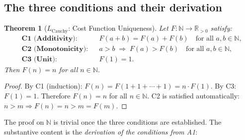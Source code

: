\documentclass[11pt]{article}
\newtheorem{theorem}{Theorem}[section]
\theoremstyle{definition}
\begin{document}
\subsection{The three conditions and their derivation}
\label{sec:cauchy_conditions}

\begin{theorem}[$L_{\mathrm{Cauchy}}$: Cost Function Uniqueness]\label{thm:LCauchy}
Let $F: \mathbb{N} \to \mathbb{R}_{>0}$ satisfy:
\begin{align}
  &\textbf{C1 (Additivity):}  &&F(a + b) = F(a) + F(b)
    \quad \text{for all } a, b \in \mathbb{N}, \label{eq:C1_supp} \\
  &\textbf{C2 (Monotonicity):} &&a > b \;\Rightarrow\; F(a) > F(b)
    \quad \text{for all } a, b \in \mathbb{N}, \label{eq:C2_supp} \\
  &\textbf{C3 (Unit):}          &&F(1) = 1. \label{eq:C3_supp}
\end{align}
Then $F(n) = n$ for all $n \in \mathbb{N}$.
\end{theorem}

\begin{proof}
By C1 (induction): $F(n) = F(1 + 1 + \cdots + 1) = n \cdot F(1)$.
By C3: $F(1) = 1$.  Therefore $F(n) = n$ for all $n \in \mathbb{N}$.
C2 is satisfied automatically: $n > m \Rightarrow F(n) = n > m = F(m)$.
\end{proof}

\noindent The proof on $\mathbb{N}$ is trivial once the three conditions
are established.  The substantive content is the \emph{derivation of the
conditions from A1}:
\end{document}
